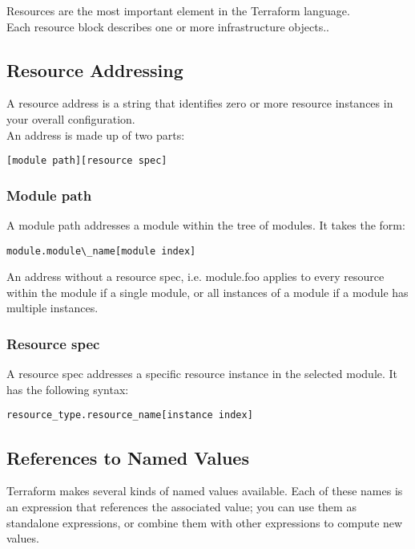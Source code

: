 \documentclass[12pt, letterpaper, twoside]{article}
\begin{document}
Resources are the most important element in the Terraform language.\\
Each resource block describes one or more infrastructure objects..\\

\subsection{Resource Addressing}
A resource address is a string that identifies zero or more resource instances in your overall configuration.\\
An address is made up of two parts:

\begin{verbatim}
[module path][resource spec]
\end{verbatim}

\subsubsection{Module path}
A module path addresses a module within the tree of modules. It takes the form:

\begin{verbatim}
module.module\_name[module index]
\end{verbatim}

An address without a resource spec, i.e. module.foo applies to every resource within the module if a single 
module, or all instances of a module if a module has multiple instances.

\subsubsection{Resource spec}
A resource spec addresses a specific resource instance in the selected module. It has the following syntax:

\begin{verbatim} 
resource_type.resource_name[instance index]
\end{verbatim}

\subsection{References to Named Values}
Terraform makes several kinds of named values available. Each of these names is an expression that references 
the associated value; you can use them as standalone expressions, or combine them with other expressions to 
compute new values.
\end{document}
